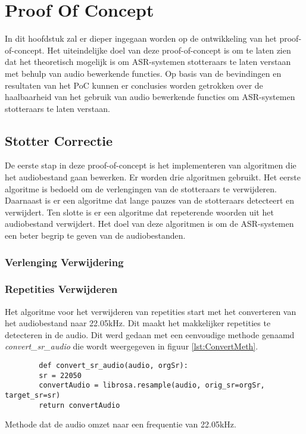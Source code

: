 \chapter{Proof Of Concept}%
\label{ch:Proof of Concept}

In dit hoofdstuk zal er dieper ingegaan worden op de ontwikkeling van het proof-of-concept. Het uiteindelijke doel van deze proof-of-concept is om te laten zien dat het theoretisch mogelijk is om ASR-systemen stotteraars te laten verstaan met behulp van audio bewerkende functies. Op basis van de bevindingen en resultaten van het PoC kunnen er conclusies worden getrokken over de haalbaarheid van het gebruik van audio bewerkende functies om ASR-systemen stotteraars te laten verstaan.
\section{Stotter Correctie}
De eerste stap in deze proof-of-concept is het implementeren van algoritmen die het audiobestand gaan bewerken. Er worden drie algoritmen gebruikt. Het eerste algoritme is bedoeld om de verlengingen van de stotteraars te verwijderen. Daarnaast is er een algoritme dat lange pauzes van de stotteraars detecteert en verwijdert. Ten slotte is er een algoritme dat repeterende woorden uit het audiobestand verwijdert. Het doel van deze algoritmen is om de ASR-systemen een beter begrip te geven van de audiobestanden.

\subsection{Verlenging Verwijdering}

\subsection{Repetities Verwijderen}
Het algoritme voor het verwijderen van repetities start met het converteren van het audiobestand naar 22.05kHz. Dit maakt het makkelijker repetities te detecteren in de audio. Dit werd gedaan met een eenvoudige methode genaamd \emph{convert\_sr\_audio} die wordt weergegeven in figuur \ref{lst:ConvertMeth}.\\
\begin{listing}[H]
    \begin{verbatim}
        def convert_sr_audio(audio, orgSr):
        sr = 22050
        convertAudio = librosa.resample(audio, orig_sr=orgSr, target_sr=sr)
        return convertAudio
    \end{verbatim}
    \caption{Methode dat de audio omzet naar een frequentie van 22.05kHz.}
    \label{lst:ConvertMeth}
\end{listing}

